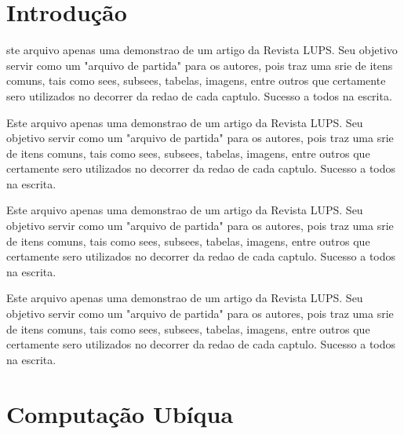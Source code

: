 \documentclass[12pt,a4paper,compsoc]{IEEEtran}
\begin{document}
\maketitle



\section{Introdução}


ste arquivo  apenas uma demonstrao de um artigo da Revista LUPS. Seu objetivo  servir como um "arquivo de partida" para os autores, pois traz uma srie de itens comuns, tais como sees, subsees, tabelas, imagens, entre outros que certamente sero utilizados no decorrer da redao de cada captulo. Sucesso a todos na escrita.


Este arquivo  apenas uma demonstrao de um artigo da Revista LUPS. Seu objetivo  servir como um "arquivo de partida" para os autores, pois traz uma srie de itens comuns, tais como sees, subsees, tabelas, imagens, entre outros que certamente sero utilizados no decorrer da redao de cada captulo. Sucesso a todos na escrita.


Este arquivo  apenas uma demonstrao de um artigo da Revista LUPS. Seu objetivo  servir como um "arquivo de partida" para os autores, pois traz uma srie de itens comuns, tais como sees, subsees, tabelas, imagens, entre outros que certamente sero utilizados no decorrer da redao de cada captulo. Sucesso a todos na escrita.


Este arquivo  apenas uma demonstrao de um artigo da Revista LUPS. Seu objetivo  servir como um "arquivo de partida" para os autores, pois traz uma srie de itens comuns, tais como sees, subsees, tabelas, imagens, entre outros que certamente sero utilizados no decorrer da redao de cada captulo. Sucesso a todos na escrita.



\section{Computação Ubíqua}
\end{document}
